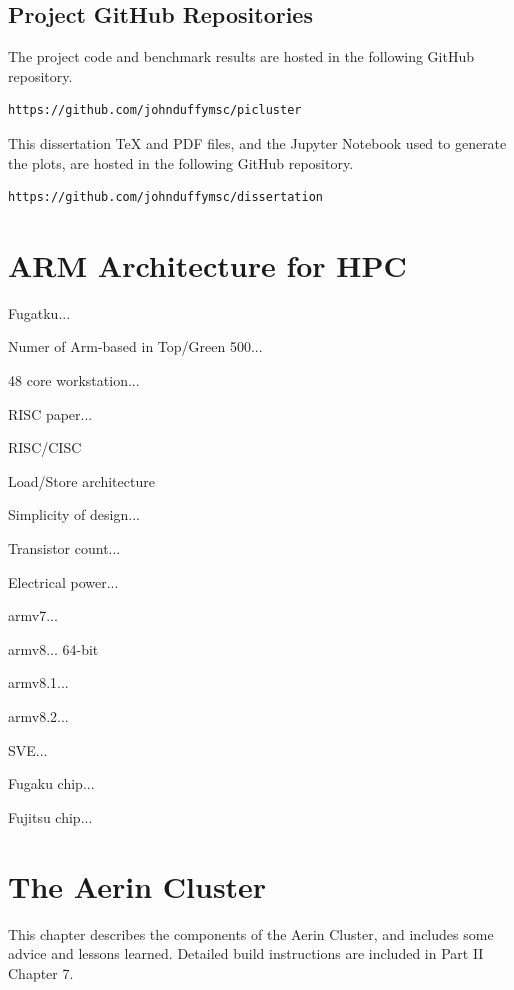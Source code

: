 \documentclass{report}
\begin{document}
%
%
\section{Project GitHub Repositories}

The project code and benchmark results are hosted in the following GitHub repository.

\begin{verbatim}
https://github.com/johnduffymsc/picluster
\end{verbatim}

This dissertation TeX and PDF files, and the Jupyter Notebook used to generate the plots, are hosted in the following GitHub repository.

\begin{verbatim}
https://github.com/johnduffymsc/dissertation
\end{verbatim}
 


%
%
\chapter{ARM Architecture for HPC}

Fugatku...

Numer of Arm-based in Top/Green 500...

48 core workstation...

RISC paper...

RISC/CISC

Load/Store architecture

Simplicity of design...

Transistor count...

Electrical power...

armv7...

armv8... 64-bit

armv8.1...

armv8.2...

SVE...

Fugaku chip...

Fujitsu chip... 



%
%
\chapter{The Aerin Cluster}


This chapter describes the components of the Aerin Cluster, and includes some advice and lessons learned. Detailed build instructions are included in Part II Chapter 7. 
\end{document}
